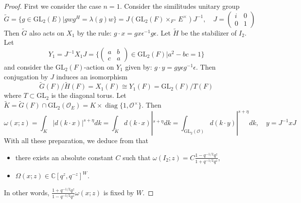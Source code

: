 \documentclass{amsart}
\theoremstyle{definition}
\theoremstyle{remark}
\newcommand{\1}{\mathbf{1}}
\newcommand{\C}{\mathbb{C}}
\newcommand{\GL}{\mathrm{GL}}
\DeclareMathOperator{\diag}{diag}
\theoremstyle{definition}
\newcommand{\CO}{{\mathcal {O}}}
\newcommand{\wt}{\widetilde}
\begin{document}
\begin{proof}First we consider the case $n=1$. Consider the similitudes unitary group \[\wt{G}=\{g\in \GL_2(E)| gwg^H=\lambda(g)w\}= J (\GL_2(F)\times_{F^\times} E^\times) J^{-1},\quad J=\begin{pmatrix} i & 0\\ 0 & 1\end{pmatrix} \]
Then $\wt{G}$ also acts on $X_1$ by the rule: $g\cdot x= gx\epsilon^{-1}g \epsilon$. Let $\wt{H}$ be the stabilizer of $I_2$. Let \[Y_1=J^{-1}X_1 J=\{\begin{pmatrix}a & b\\ c & a\end{pmatrix}\in \GL_2(F)| a^2-bc=1\}\]
and consider the $\GL_2(F)$-action on $Y_1$ given by: $g\cdot y=gy \epsilon g^{-1}\epsilon$. Then 
conjugation by $J$ induces an isomorphism \[\wt{G}(F)/\wt{H}(F)=X_1(F)\cong Y_1(F)=\GL_2(F)/T(F)\]
where $T\subset \GL_2$ is the diagonal torus.
Let $\wt{K}=\wt{G}(F)\cap \GL_2(\CO_E)= K\times\diag\{1,\CO^\times\}$. Then \[\omega(x;z)=\int_K|d(k\cdot x)|^{s+\eta}dk=\int_{\wt{K}}d(k\cdot x)|^{s+\eta}dk=\int_{\GL_2(\CO)}d(k\cdot y)|^{s+\eta}dk,\quad y=J^{-1}xJ\] 
With all these preparation, we deduce  from \cite[Prop 4.3, Lemma 5.2, Lemma 5.6, Lemma 5.13]{Off04} that 
\begin{itemize}
    \item there exists an absolute constant $C$ such that $\omega(I_2;z)=C\frac{1-q^{-1/2}q^z}{1+q^{-1/2}q^z}$,
    \item $\Omega(x;z)\in \C[q^z,q^{-z}]^W$.
\end{itemize} 
In other words, $\frac{1+q^{-1/2}q^z}{1-q^{-1/2}q^z} \omega(x;z)$ is fixed by $W$.



\end{proof}
\end{document}

